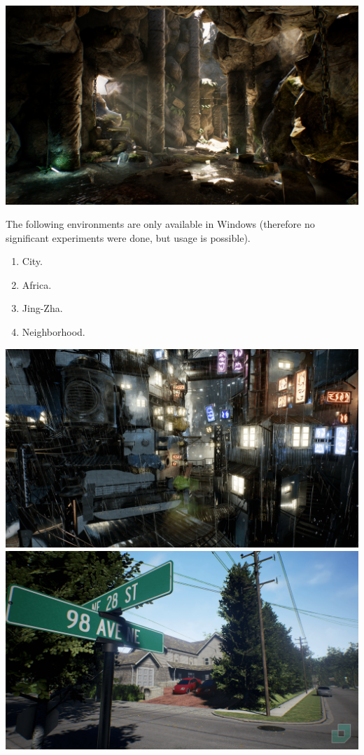 \documentclass{article}
\begin{document}
 \includegraphics[scale=0.1]{environments/cave.png}

The following environments are only available in Windows 
(therefore no significant experiments were done, but usage is possible).

\begin{enumerate}
    \item City.
    \item Africa.
    \item Jing-Zha.
    \item Neighborhood.
\end{enumerate}

\includegraphics[scale=0.1]{environments/city.png}
\includegraphics[scale=0.1]{environments/neighborhood.png}
\end{document}
